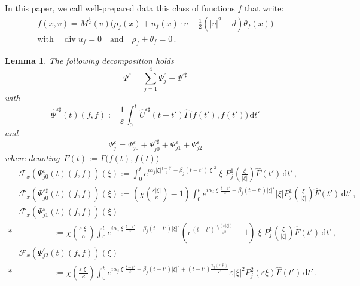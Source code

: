 \documentclass[11pt]{article}
\newtheorem{lemm}[theo]{Lemma}
\theoremstyle{definition}
\numberwithin{equation}{section}
\numberwithin{figure}{section}
\numberwithin{table}{section}
\newcommand*{\dd}{\mathrm{d}}
\newcommand*{\dt}{\dd t}
\newcommand*\eps{{\varepsilon}}
\newcommand*\e{{\varepsilon}}
\newcommand{\Div}{\operatorname{div}}
\begin{document}
In this paper, we call {well-prepared data} this class of functions $f$ that write:
\begin{multline}\label{defwp}
f (x,v) = M^\frac12(v)\Big(\rho_{f} (x) + u_{f}(x) \cdot v + \frac12(|v|^2- d) \theta_{f} (x)\Big) \\
\text{with} \quad \Div u_f = 0 \quad \text{and} \quad \rho_f+ \theta_f = 0 \,.
\end{multline}


\begin{lemm}\label{estimatePsiepslimitPsi0}
The following decomposition holds
\[
\Psi^\e = \sum_{j=1}^4 \Psi^\eps_j + \Psi^{\eps \sharp}
\]
with
\[
\widehat \Psi^{\eps \sharp}(t)(f,f):=\frac{1}{\eps} \int_0^t \widehat U^{\eps\sharp}(t-t') \widehat \Gamma \big(f(t'),f(t')\big) \, \dt'
\]
and
\begin{equation}\label{decompositionPsiappendix}
\Psi^\e_j = \Psi^\eps_{j0} + \Psi^{\eps \sharp}_{j0} + \Psi^\eps_{j1} + \Psi^\eps_{j2}
\end{equation}
where denoting~$F(t) := \Gamma \big(f(t),f(t)\big)$
\begingroup
\allowdisplaybreaks
\begin{align*}
&\mathcal{F}_x \left(\Psi^\eps_{j0}(t)(f,f)\right)(\xi) := \int_0^t e^{i\alpha_j |\xi|\frac{t-t'}{\eps} - \beta_j (t-t') |\xi|^2} |\xi|P_{j}^1\left(\frac{\xi}{|\xi|}\right) \widehat F(t') \, \dt' \,, \\
&\mathcal{F}_x \left(\Psi^{\eps\sharp}_{j0}(t)(f,f)\right)(\xi):= \left(\chi\left (\frac{\eps|\xi|}\kappa\right)-1\right) \int_0^te^{i\alpha_j |\xi|\frac{t-t'}{\eps} - \beta_j (t-t') |\xi|^2}|\xi|P_{j}^1\left(\frac{\xi}{|\xi|}\right) \widehat F(t') \, \dt' \,,\\
&\mathcal{F}_x \left(\Psi^\eps_{j1}(t)(f,f)\right)(\xi) \\*
&\qquad\qquad := \chi\left (\frac{\eps|\xi|}\kappa\right) \int_0^te^{i\alpha_j |\xi|\frac{t-t'}{\eps} - \beta_j (t-t') |\xi|^2} \left(e^{(t-t') \frac{\gamma_j(\eps|\xi|)}{\eps^2}}-1 \right)|\xi|P_{j}^1\left(\frac{\xi}{|\xi|}\right) \widehat F(t') \, \dt'\,, \\
&\mathcal{F}_x \left(\Psi^\eps_{j2}(t)(f,f)\right)(\xi) \\*
&\qquad\qquad := \chi\left (\frac{\eps|\xi|}\kappa\right) \int_0^te^{i\alpha_j |\xi|\frac{t-t'}{\eps} - \beta_j (t-t') |\xi|^2+ (t-t') \frac{\gamma_j(\eps|\xi|)}{\eps^2}} \eps |\xi|^2P^2_j(\eps\xi) \widehat F(t') \, \dt'
\,.
\end{align*}
\endgroup
\end{lemm}
\end{document}
